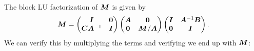 \documentclass[twoside,10pt]{article}
\begin{document}
  \quad The block LU factorization of $\bm{M}$ is given by 
  \begin{equation*}
    \bm{M} = 
    \begin{pmatrix}
      \bm{I} & \bm{0} \\
      \bm{C} \bm{A}^{-1} & \bm{I}
    \end{pmatrix}
    \begin{pmatrix}
      \bm{A} & \bm{0} \\
      \bm{0} & \bm{M} / \bm{A}
    \end{pmatrix}
    \begin{pmatrix}
      \bm{I} & \bm{A}^{-1} \bm{B} \\
      \bm{0} & \bm{I}
    \end{pmatrix}.
  \end{equation*}
  \quad We can verify this by multiplying the terms and verifying we end up with $\bm{M}$:
\end{document}
